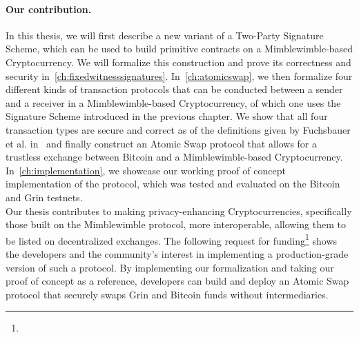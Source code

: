 \paragraph{Our contribution.} In this thesis, we will first describe a new variant of a Two-Party Signature Scheme, which can be used to build primitive contracts on a Mimblewimble-based Cryptocurrency.
We will formalize this construction and prove its correctness and security in~\cref{ch:fixedwitnesssignatures}.
In~\cref{ch:atomicswap}, we then formalize four different kinds of transaction protocols that can be conducted between a sender and a receiver in a Mimblewimble-based Cryptocurrency, of which one uses the Signature Scheme introduced in the previous chapter.
We show that all four transaction types are secure and correct as of the definitions given by Fuchsbauer et al. in~\cite{fuchsbauer2019aggregate} and finally construct an Atomic Swap protocol that allows for a trustless exchange between Bitcoin and a Mimblewimble-based Cryptocurrency.
In~\cref{ch:implementation}, we showcase our working proof of concept implementation of the protocol, which was tested and evaluated on the Bitcoin and Grin testnets.\\
Our thesis contributes to making privacy-enhancing Cryptocurrencies, specifically those built on the Mimblewimble protocol, more interoperable, allowing them to be listed on decentralized exchanges.
The following request for funding\footnote{\urlgrinfund} shows the developers and the community's interest in implementing a production-grade version of such a protocol.
By implementing our formalization and taking our proof of concept as a reference, developers can build and deploy an Atomic Swap protocol that securely swaps Grin and Bitcoin funds without intermediaries.

